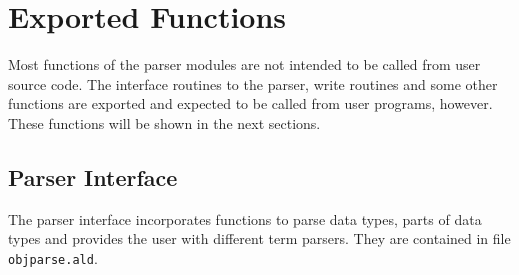 \section{Exported Functions}

Most  functions of the parser modules are not intended to be called
from user source code.
The interface routines to the parser, write routines and some other
functions are  exported and expected to be called from user programs,
however.
These functions will be shown in the next sections.

\subsection{Parser Interface}

The parser interface incorporates functions to parse data types,
parts of data types and provides the user with different term
parsers. They are contained in file {\tt objparse.ald}.

